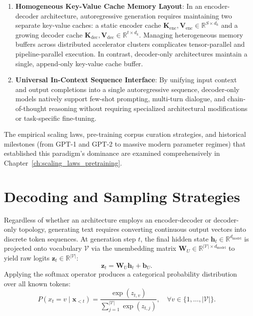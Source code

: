 \documentclass[../../../main.tex]{subfiles}
\begin{document}
\begin{enumerate}
    \item \textbf{Homogeneous Key-Value Cache Memory Layout}: In an encoder-decoder architecture, autoregressive generation requires maintaining two separate key-value caches: a static encoder cache $\mathbf{K}_{\text{enc}}, \mathbf{V}_{\text{enc}} \in \mathbb{R}^{S \times d_k}$ and a growing decoder cache $\mathbf{K}_{\text{dec}}, \mathbf{V}_{\text{dec}} \in \mathbb{R}^{t \times d_k}$. Managing heterogeneous memory buffers across distributed accelerator clusters complicates tensor-parallel and pipeline-parallel execution. In contrast, decoder-only architectures maintain a single, append-only key-value cache buffer.
    
    \item \textbf{Universal In-Context Sequence Interface}: By unifying input context and output completions into a single autoregressive sequence, decoder-only models natively support few-shot prompting, multi-turn dialogue, and chain-of-thought reasoning without requiring specialized architectural modifications or task-specific fine-tuning.
\end{enumerate}

The empirical scaling laws, pre-training corpus curation strategies, and historical milestones (from GPT-1 and GPT-2 to massive modern parameter regimes) that established this paradigm's dominance are examined comprehensively in Chapter~\ref{ch:scaling_laws_pretraining}.


\section{Decoding and Sampling Strategies}
\label{sec:decoding_and_sampling}

Regardless of whether an architecture employs an encoder-decoder or decoder-only topology, generating text requires converting continuous output vectors into discrete token sequences. At generation step $t$, the final hidden state $\mathbf{h}_t \in \mathbb{R}^{d_{\text{model}}}$ is projected onto vocabulary $\mathcal{V}$ via the unembedding matrix $\mathbf{W}_U \in \mathbb{R}^{|\mathcal{V}| \times d_{\text{model}}}$ to yield raw logits $\mathbf{z}_t \in \mathbb{R}^{|\mathcal{V}|}$:
\begin{equation}
\mathbf{z}_t = \mathbf{W}_U \mathbf{h}_t + \mathbf{b}_U.
\label{eq:unembedding_projection_formal}
\end{equation}
Applying the softmax operator produces a categorical probability distribution over all known tokens:
\begin{equation}
P(x_t = v \mid \mathbf{x}_{<t}) = \frac{\exp(z_{t,v})}{\sum_{j=1}^{|\mathcal{V}|} \exp(z_{t,j})}, \quad \forall v \in \{1, \dots, |\mathcal{V}|\}.
\label{eq:unembedding_softmax_distribution}
\end{equation}
\end{document}
